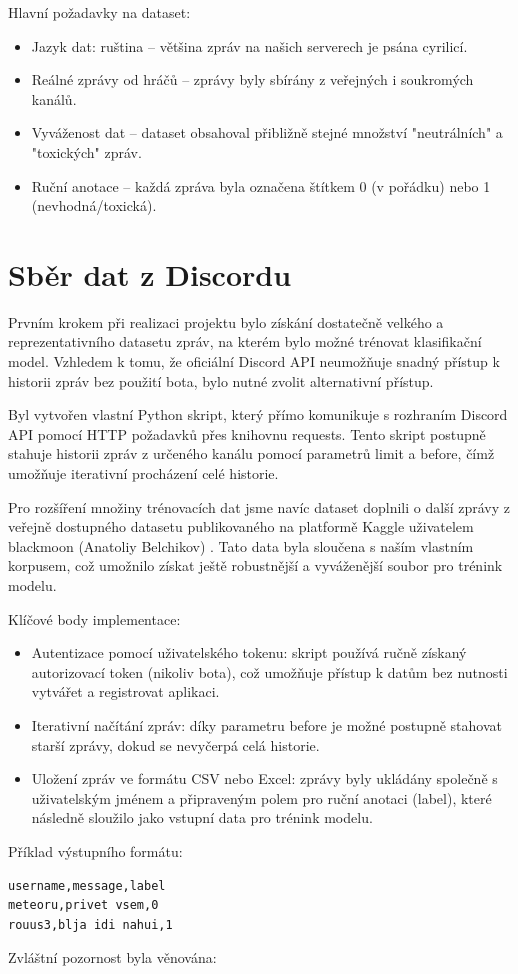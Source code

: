 \documentclass[FM,Proj]{tulthesis}
\begin{document}
Hlavní požadavky na dataset:

\begin{itemize}
    \item Jazyk dat: ruština – většina zpráv na našich serverech je psána cyrilicí.
    \item Reálné zprávy od hráčů – zprávy byly sbírány z veřejných i soukromých kanálů.
    \item Vyváženost dat – dataset obsahoval přibližně stejné množství "neutrálních" a "toxických" zpráv.
    \item Ruční anotace – každá zpráva byla označena štítkem 0 (v pořádku) nebo 1 (nevhodná/toxická).
\end{itemize}
\section{Sběr dat z Discordu}\label{deklarace}

Prvním krokem při realizaci projektu bylo získání dostatečně velkého a reprezentativního datasetu zpráv, na kterém bylo možné trénovat klasifikační model. Vzhledem k tomu, že oficiální Discord API neumožňuje snadný přístup k historii zpráv bez použití bota, bylo nutné zvolit alternativní přístup.

Byl vytvořen vlastní Python skript, který přímo komunikuje s rozhraním Discord API pomocí HTTP požadavků přes knihovnu requests. Tento skript postupně stahuje historii zpráv z určeného kanálu pomocí parametrů limit a before, čímž umožňuje iterativní procházení celé historie.

Pro rozšíření množiny trénovacích dat jsme navíc dataset doplnili o další zprávy z veřejně dostupného datasetu publikovaného na platformě Kaggle uživatelem blackmoon (Anatoliy Belchikov) \cite{blackmoon2019russiantoxiccomments}. Tato data byla sloučena s naším vlastním korpusem, což umožnilo získat ještě robustnější a vyváženější soubor pro trénink modelu.

Klíčové body implementace:

\begin{itemize}
    \item Autentizace pomocí uživatelského tokenu: skript používá ručně získaný autorizovací token (nikoliv bota), což umožňuje přístup k datům bez nutnosti vytvářet a registrovat aplikaci.
    \item Iterativní načítání zpráv: díky parametru before je možné postupně stahovat starší zprávy, dokud se nevyčerpá celá historie.
    \item Uložení zpráv ve formátu CSV nebo Excel: zprávy byly ukládány společně s uživatelským jménem a připraveným polem pro ruční anotaci (label), které následně sloužilo jako vstupní data pro trénink modelu.
\end{itemize}
Příklad výstupního formátu:
\begin{verbatim}
username,message,label
meteoru,privet vsem,0
rouus3,blja idi nahui,1
\end{verbatim}
Zvláštní pozornost byla věnována:
\end{document}
